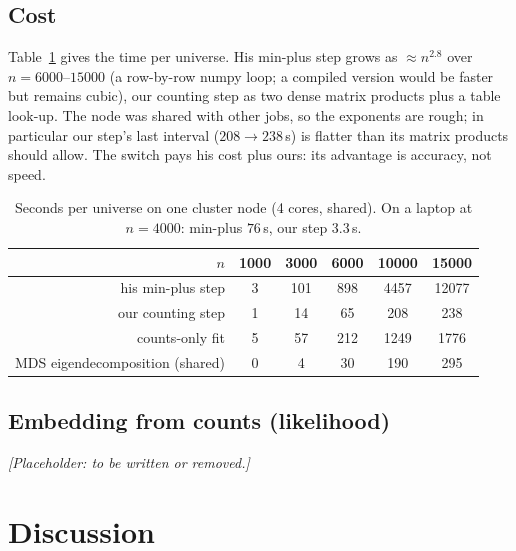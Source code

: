 \documentclass[11pt,a4paper]{article}
\begin{document}
\subsection{Cost}
Table~\ref{tab:cost} gives the time per universe. His min-plus step grows as $\approx n^{2.8}$ over $n=6000$--$15000$ (a row-by-row numpy loop; a compiled version would be faster but remains cubic), our counting step as two dense matrix products plus a table look-up. The node was shared with other jobs, so the exponents are rough; in particular our step's last interval ($208\to238$\,s) is flatter than its matrix products should allow. The switch pays his cost plus ours: its advantage is accuracy, not speed.

\begin{table}[t]
\centering\small
\begin{tabular}{@{}rccccc@{}}
\toprule
$n$ & 1000 & 3000 & 6000 & 10000 & 15000\\
\midrule
his min-plus step & 3 & 101 & 898 & 4457 & 12077\\
our counting step & 1 & 14 & 65 & 208 & 238\\
counts-only fit & 5 & 57 & 212 & 1249 & 1776\\
MDS eigendecomposition (shared) & 0 & 4 & 30 & 190 & 295\\
\bottomrule
\end{tabular}
\caption{Seconds per universe on one cluster node (4 cores, shared). On a laptop at $n=4000$: min-plus $76$\,s, our step $3.3$\,s.}
\label{tab:cost}
\end{table}

\subsection{Embedding from counts (likelihood)}\label{sec:likelihood}
\textit{[Placeholder: to be written or removed.]}

\section{Discussion}\label{sec:disc}
\end{document}
